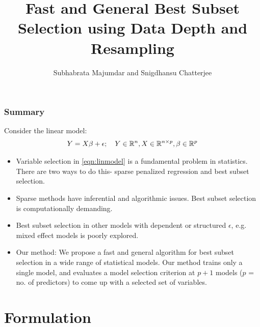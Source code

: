 \documentclass[10pt]{beamer}
\title[Fast Model Selection with $e$-values]
{\Large  
Fast and General Best Subset Selection using Data Depth and Resampling}
\author[Majumdar and Chatterjee]{Subhabrata Majumdar and Snigdhansu Chatterjee}
\institute[]{University of Florida and University of Minnesota Twin Cities\\
\vspace{1em}
December 21, 2017}
\date [September 19, 2017]
\theoremstyle{definition}
\begin{document}

\frame{ \titlepage}


\begin{frame}
\frametitle{Summary}

Consider the linear model:
%
\begin{align}\label{eqn:linmodel}
Y = X \beta + \epsilon; \quad
Y \in {\mathbb{R}}^n, X \in {\mathbb{R}}^{n \times p}, \beta \in {\mathbb{R}}^p
\end{align}
%
\begin{itemize}
\item Variable selection in \eqref{eqn:linmodel} is a fundamental problem in statistics. There are two ways to do this- sparse penalized regression and best subset selection.
\vspace{1em}

\item Sparse methods have inferential and algorithmic issues. Best subset selection is computationally demanding.
\vspace{1em}

\item Best subset selection in other models with dependent or structured $\epsilon$, e.g. mixed effect models is poorly explored.
\vspace{1em}

\item {\colbit Our method:} We propose a fast and general algorithm for best subset selection in a wide range of statistical models. Our method trains only a single model, and evaluates a model selection criterion at $p+1$ models ($p$ = no. of predictors) to come up with a selected set of variables.
\end{itemize}

\end{frame}



\section{Formulation}
\end{document}
